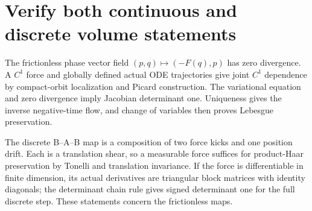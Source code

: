 \documentclass[11pt,a4paper]{report}
\begin{document}
\section{\texorpdfstring{Verify both continuous and discrete volume statements}{Verify both continuous and discrete volume statements}}


The frictionless phase vector field \((p,q)\mapsto(-F(q),p)\) has zero divergence. A \(C^1\) force and globally defined actual ODE trajectories give joint \(C^1\) dependence by compact-orbit localization and Picard construction. The variational equation and zero divergence imply Jacobian determinant one. Uniqueness gives the inverse negative-time flow, and change of variables then proves Lebesgue preservation.



The discrete B–A–B map is a composition of two force kicks and one position drift. Each is a translation shear, so a measurable force suffices for product-Haar preservation by Tonelli and translation invariance. If the force is differentiable in finite dimension, its actual derivatives are triangular block matrices with identity diagonals; the determinant chain rule gives signed determinant one for the full discrete step. These statements concern the frictionless maps.
\end{document}
